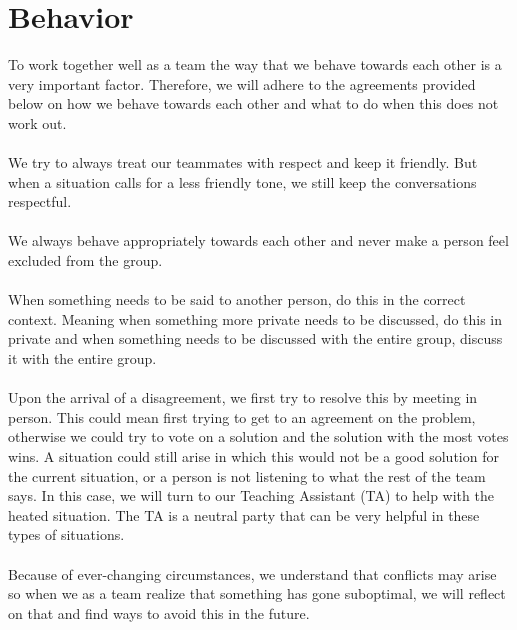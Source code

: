 \section{Behavior}
To work together well as a team the way that we behave towards each other is a very important factor. Therefore, we will adhere to the agreements provided below on how we behave towards each other and what to do when this does not work out. 
\\\\
We try to always treat our teammates with respect and keep it friendly. But when a situation calls for a less friendly tone, we still keep the conversations respectful.  
\\\\
We always behave appropriately towards each other and never make a person feel excluded from the group.  
\\\\
When something needs to be said to another person, do this in the correct context. Meaning when something more private needs to be discussed, do this in private and when something needs to be discussed with the entire group, discuss it with the entire group. 
\\\\
Upon the arrival of a disagreement, we first try to resolve this by meeting in person. This could mean first trying to get to an agreement on the problem, otherwise we could try to vote on a solution and the solution with the most votes wins. A situation could still arise in which this would not be a good solution for the current situation, or a person is not listening to what the rest of the team says. In this case, we will turn to our Teaching Assistant (TA) to help with the heated situation. The TA is a neutral party that can be very helpful in these types of situations. 
\\\\
Because of ever-changing circumstances, we understand that conflicts may arise so when we as a team realize that something has gone suboptimal, we will reflect on that and find ways to avoid this in the future. 

